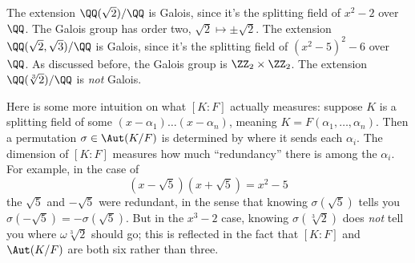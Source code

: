 \begin{example}
	\listhack
	\begin{enumerate}[(a)]
		\ii The extension $\QQ(\sqrt2) / \QQ$ is Galois,
		since it's the splitting field of $x^2-2$ over $\QQ$.
		The Galois group has order two, $\sqrt 2 \mapsto \pm \sqrt 2$.
		\ii The extension $\QQ(\sqrt2, \sqrt 3) / \QQ$ is Galois,
		since it's the splitting field of $(x^2-5)^2-6$ over $\QQ$.
		As discussed before, the Galois group is $\Zc 2 \times \Zc 2$.
		\ii The extension $\QQ(\sqrt[3]{2}) / \QQ$ is \emph{not} Galois.
	\end{enumerate}
\end{example}

Here is some more intuition on what $[K:F]$ actually measures: suppose $K$ is a splitting field
of some $(x-\alpha_1) \dots (x-\alpha_n)$, meaning $K = F(\alpha_1, \dots, \alpha_n)$.
Then a permutation $\sigma \in \Aut(K/F)$ is determined by where it sends each $\alpha_i$.
The dimension of $[K:F]$ measures how much ``redundancy'' there is among the $\alpha_i$.
For example, in the case of \[ (x-\sqrt5)(x+\sqrt5) = x^2-5  \]the $\sqrt 5$ and $-\sqrt 5$ were redundant,
in the sense that knowing $\sigma(\sqrt 5)$ tells you $\sigma(-\sqrt 5) = -\sigma(\sqrt 5)$.
But in the $x^3-2$ case, knowing $\sigma(\sqrt[3]{2})$ does \emph{not} tell you where
$\omega\sqrt[3]{2}$ should go; this is reflected in the fact that $[K:F]$ and $\Aut(K/F)$
are both six rather than three.


%

